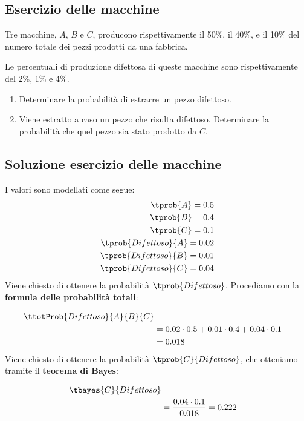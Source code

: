\documentclass[\main/main.tex]{subfiles}
\begin{document}
\subsection{Esercizio delle macchine}
Tre macchine, $A$, $B$ e $C$, producono rispettivamente il 50\%, il 40\%, e il 10\% del numero totale dei pezzi prodotti da una fabbrica.

Le percentuali di produzione difettosa di queste macchine sono rispettivamente del 2\%, 1\% e 4\%.

\begin{enumerate}
  \item Determinare la probabilità di estrarre un pezzo difettoso.
  \item Viene estratto a caso un pezzo che risulta difettoso. Determinare la probabilità che quel pezzo sia stato prodotto da $C$.
\end{enumerate}

\subsection{Soluzione esercizio delle macchine}
I valori sono modellati come segue:
\begin{align*}
  \tprob{A} = 0.5             \\
  \tprob{B} = 0.4             \\
  \tprob{C} = 0.1             \\
  \tprob{Difettoso}{A} = 0.02 \\
  \tprob{Difettoso}{B} = 0.01 \\
  \tprob{Difettoso}{C} = 0.04 \\
\end{align*}
Viene chiesto di ottenere la probabilità $\tprob{Difettoso}$. Procediamo con la \textbf{formula delle probabilità totali}:

\formulaProbTot

\begin{align*}
  \ttotProb{Difettoso}{A}{B}{C}                \\
   & = 0.02\cdot0.5 + 0.01\cdot0.4 + 0.04\cdot0.1 \\
   & =0.018
\end{align*}
Viene chiesto di ottenere la probabilità $\tprob{C}{Difettoso}$, che otteniamo tramite il \textbf{teorema di Bayes}:

\bayesTh

\begin{align*}
  \tbayes{C}{Difettoso}            \\
   & = \frac{0.04\cdot 0.1}{0.018}
  = 0.22\bar{2}
\end{align*}
\end{document}
